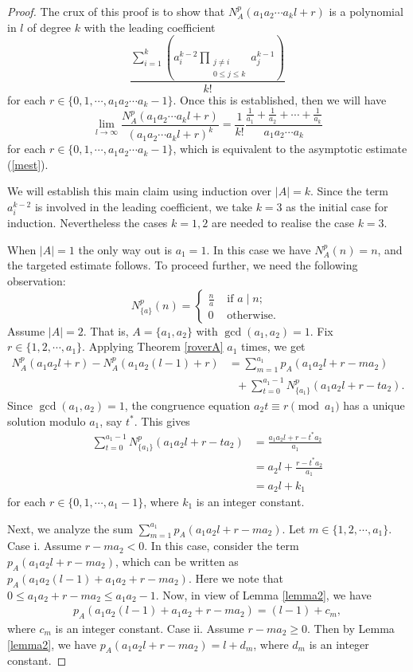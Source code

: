 \documentclass[10pt,a4paper]{amsart}
\begin{document}
\begin{proof}
The crux of this proof is to show that $N_A^p(a_1a_2\cdots a_kl+r)$ is a polynomial in $l$ of degree $k$ with the leading coefficient \[\frac{\sum_{i=1}^{k}\left(a_i^{k-2}\prod_{\substack{j\neq i\\ 0\leq j\leq k}}a_j^{k-1}\right)}{k!}\] for each $r\in\{0,1,\cdots ,a_1a_2\cdots a_k-1\}$. Once this is established, then we will have
\[\lim_{l\to\infty}\frac{N^p_A(a_1a_2\cdots a_kl+r)}{(a_1a_2\cdots a_kl+r)^{k}}=\frac{1}{k!}\frac{\frac{1}{a_1}+\frac{1}{a_2}+\cdots +\frac{1}{a_k}}{a_1a_2\cdots a_k}
\]
for each $r\in\{0,1,\cdots ,a_1a_2\cdots a_k-1\}$, which is equivalent to the asymptotic estimate (\ref{mest}).

We will establish this main claim using induction over $|A|=k$. Since the term $a_i^{k-2}$ is involved in the leading coefficient, we take $k=3$ as the initial case for induction. Nevertheless the cases $k=1,2$ are needed to realise the case $k=3$. 

When $|A|=1$ the only way out is $a_1=1$. In this case we have $N_A^p(n)=n$, and the targeted estimate follows. To proceed further, we need the following observation: 
\[
N_{\{a\}}^p(n)=\begin{cases}\frac{n}{a} &\text{ if }a\mid n;\\
0&\text{ otherwise. }
\end{cases}
\]
Assume  $|A|=2$. That is, $A=\{a_1,a_2\}$ with $\gcd(a_1,a_2)=1$.
Fix $r\in\{1,2,\cdots ,a_1\}$. Applying Theorem \ref{roverA} $a_1$ times, we get
\begin{align*}
N_A^p(a_1a_2l+r)-N_A^p(a_1a_2(l-1)+r)&=\sum_{m=1}^{a_1}p_A(a_1a_2l+r-ma_2)\\ &\ \ \ +\sum_{t=0}^{a_1-1}N_{\{a_1\}}^p(a_1a_2l+r-ta_2).
\end{align*}
Since $\gcd(a_1,a_2)=1$, the congruence equation $a_2t\equiv r\pmod {a_1}$ has a unique solution modulo $a_1$, say $t^*$. This gives
\begin{align*}
\sum_{t=0}^{a_1-1}N_{\{a_1\}}^p(a_1a_2l+r-ta_2)&=\frac{a_1a_2l+r-t^*a_2}{a_1}\\ 
&=a_2l+\frac{r-t^*a_2}{a_1}\\
&=a_2l+k_1
\end{align*}
for each $r\in\{0,1,\cdots ,a_1-1\}$, where $k_1$ is an integer constant.

Next, we analyze the sum $\sum_{m=1}^{a_1}p_A(a_1a_2l+r-ma_2)$. Let $m\in\{1,2,\cdots ,a_1\}$. \newline 
Case i. Assume $r-ma_2<0$. In this case, consider the term $p_A(a_1a_2l+r-ma_2)$, which can be written as $p_A(a_1a_2(l-1)+a_1a_2+r-ma_2)$. Here we note that $0\leq a_1a_2+r-ma_2\leq a_1a_2-1$. Now, in view of Lemma \ref{lemma2}, we have
\begin{align*}
p_A(a_1a_2(l-1)+a_1a_2+r-ma_2)=(l-1)+c_m,
\end{align*}
where $c_m$ is an integer constant.\newline 
Case ii. Assume $r-ma_2\geq 0$. Then by Lemma \ref{lemma2}, we have $p_A(a_1a_2l+r-ma_2)=l+d_m$,
where $d_m$ is an integer constant.


\end{proof}
\end{document}
